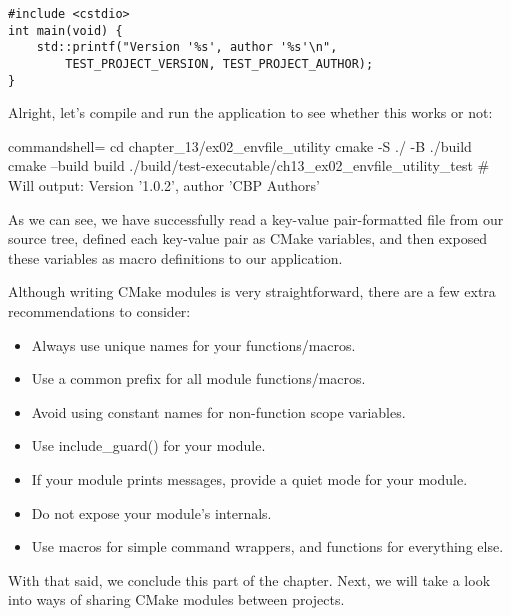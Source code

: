 \begin{lstlisting}[style=styleCXX]
#include <cstdio>
int main(void) {
	std::printf("Version '%s', author '%s'\n",
		TEST_PROJECT_VERSION, TEST_PROJECT_AUTHOR);
}
\end{lstlisting}

Alright, let's compile and run the application to see whether this works or not:

\begin{tcblisting}{commandshell={}}
cd chapter_13/ex02_envfile_utility
cmake -S ./ -B ./build
cmake --build build
./build/test-executable/ch13_ex02_envfile_utility_test
# Will output: Version '1.0.2', author 'CBP Authors'
\end{tcblisting}

As we can see, we have successfully read a key-value pair-formatted file from our source tree, defined each key-value pair as CMake variables, and then exposed these variables as macro definitions to our application.

Although writing CMake modules is very straightforward, there are a few extra recommendations to consider:

\begin{itemize}
\item 
Always use unique names for your functions/macros.

\item 
Use a common prefix for all module functions/macros.

\item 
Avoid using constant names for non-function scope variables.

\item 
Use include\_guard() for your module.

\item 
If your module prints messages, provide a quiet mode for your module.

\item 
Do not expose your module's internals.

\item 
Use macros for simple command wrappers, and functions for everything else.
\end{itemize}

With that said, we conclude this part of the chapter. Next, we will take a look into ways of sharing CMake modules between projects.


